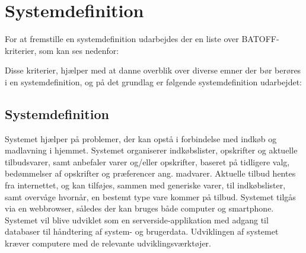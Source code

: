 \chapter{Systemdefinition}

For at fremstille en systemdefinition udarbejdes der en liste over BATOFF-kriterier\citep{OOA&D2001}, som kan ses nedenfor:



Disse kriterier, hjælper med at danne overblik over diverse emner der bør berøres i en systemdefinition, og på det grundlag er følgende systemdefinition udarbejdet:

\section{Systemdefinition}

Systemet hjælper på problemer, der kan opstå i forbindelse med indkøb og madlavning i hjemmet. 
Systemet organiserer indkøbslister, opskrifter og aktuelle tilbudsvarer, samt anbefaler varer og/eller opskrifter, baseret på tidligere valg, bedømmelser af opskrifter og præferencer ang. madvarer. 
Aktuelle tilbud hentes fra internettet, og kan tilføjes, sammen med generiske varer, til indkøbslister, samt overvåge hvornår, en bestemt type vare kommer på tilbud.
Systemet tilgås via en webbrowser, således der kan bruges både computer og smartphone. 
Systemet vil blive udviklet som en serverside-applikation med adgang til databaser til håndtering af system- og brugerdata. 
Udviklingen af systemet kræver computere med de relevante udviklingsværktøjer. 